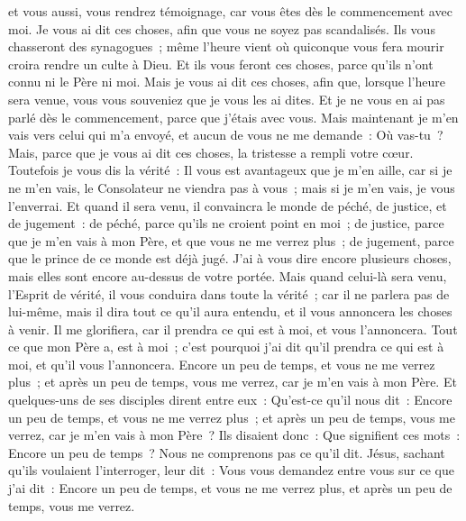 \begin{multicols}{2}
et vous aussi, vous rendrez témoignage, car vous êtes dès le commencement avec moi.
\VerseOne{}Je vous ai dit ces choses, afin que vous ne soyez pas scandalisés.
Ils vous chasseront des synagogues~; même l'heure vient où quiconque vous fera mourir croira rendre un culte à Dieu.
Et ils vous feront ces choses, parce qu'ils n'ont connu ni le Père ni moi.
Mais je vous ai dit ces choses, afin que, lorsque l'heure sera venue, vous vous souveniez que je vous les ai dites. Et je ne vous en ai pas parlé dès le commencement, parce que j'étais avec vous.
Mais maintenant je m'en vais vers celui qui m'a envoyé, et aucun de vous ne me demande~: Où vas-tu~?
Mais, parce que je vous ai dit ces choses, la tristesse a rempli votre cœur.
Toutefois je vous dis la vérité~: Il vous est avantageux que je m'en aille, car si je ne m'en vais, le Consolateur ne viendra pas à vous~; mais si je m'en vais, je vous l'enverrai.
Et quand il sera venu, il convaincra le monde de péché, de justice, et de jugement~:
de péché, parce qu'ils ne croient point en moi~;
de justice, parce que je m'en vais à mon Père, et que vous ne me verrez plus~;
de jugement, parce que le prince de ce monde est déjà jugé.
 J'ai à vous dire encore plusieurs choses, mais elles sont encore au-dessus de votre portée.
Mais quand celui-là sera venu, l'Esprit de vérité, il vous conduira dans toute la vérité~; car il ne parlera pas de lui-même, mais il dira tout ce qu'il aura entendu, et il vous annoncera les choses à venir.
Il me glorifiera, car il prendra ce qui est à moi, et vous l'annoncera.
Tout ce que mon Père a, est à moi~; c'est pourquoi j'ai dit qu'il prendra ce qui est à moi, et qu'il vous l'annoncera.
Encore un peu de temps, et vous ne me verrez plus~; et après un peu de temps, vous me verrez, car je m'en vais à mon Père.
Et quelques-uns de ses disciples dirent entre eux~: Qu'est-ce qu'il nous dit~: Encore un peu de temps, et vous ne me verrez plus~; et après un peu de temps, vous me verrez, car je m'en vais à mon Père~?
Ils disaient donc~: Que signifient ces mots~: Encore un peu de temps~? Nous ne comprenons pas ce qu'il dit.
Jésus, sachant qu'ils voulaient l'interroger, leur dit~: Vous vous demandez entre vous sur ce que j'ai dit~: Encore un peu de temps, et vous ne me verrez plus, et après un peu de temps, vous me verrez.

\end{multicols}
